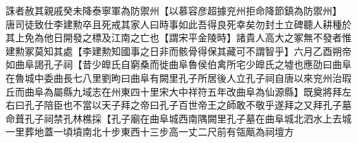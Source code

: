 誅者赦其親戚癸未降泰寧軍為防禦州【以慕容彦超據兖州拒命降節鎮為防禦州】　唐司徒致仕李建勲卒且死戒其家人曰時事如此吾得良死幸矣勿封土立碑聽人耕種於其上免為他日開發之標及江南之亡也【謂宋平金陵時】諸貴人高大之冢無不發者惟建勲冢莫知其處【李建勲知國事之日非而骸骨得保其藏可不謂智乎】六月乙酉朔帝如曲阜謁孔子祠【昔少皥氏自窮桑而徙曲阜魯侯伯禽所宅少皥氏之墟也應劭曰曲阜在魯城中委曲長七八里劉昫曰曲阜有闕里孔子所居後人立孔子祠自唐以來兖州治瑕丘而曲阜為屬縣九域志在州東四十里宋大中祥符五年改曲阜為仙源縣】既奠將拜左右曰孔子陪臣也不當以天子拜之帝曰孔子百世帝王之師敢不敬乎遂拜之又拜孔子墓命葺孔子祠禁孔林樵採【孔子廟在曲阜城西南隅闕里孔子墓在曲阜城北泗水上去城一里葬地蓋一頃墳南北十步東西十三步高一丈二尺前有瓴甋為祠壇方